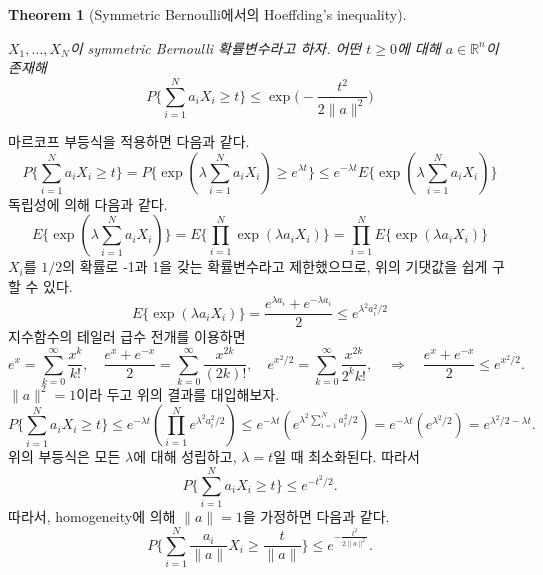\documentclass[
  letterpaper,
  DIV=11,
  numbers=noendperiod]{scrreprt}
\theoremstyle{plain}
\newtheorem{theorem}{Theorem}[chapter]
\theoremstyle{definition}
\theoremstyle{definition}
\theoremstyle{plain}
\theoremstyle{plain}
\theoremstyle{remark}
\begin{document}
\begin{theorem}[Symmetric Bernoulli에서의 Hoeffding's
inequality]\protect\hypertarget{thm-hoeffdingbernoulli}{}\label{thm-hoeffdingbernoulli}

\(X_1, \ldots, X_N\)이 symmetric Bernoulli 확률변수라고 하자. 어떤
\(t\geq 0\)에 대해 \(a \in \mathbb{R}^n\)이 존재해 \[
P\{ \sum_{i=1}^N a_i X_i \geq t \} \leq \exp \Big( - \frac{t^2}{2\|a\|^2} \Big)
\]

\end{theorem}

\begin{tcolorbox}[enhanced jigsaw, opacityback=0, colframe=quarto-callout-tip-color-frame, breakable, left=2mm, arc=.35mm, rightrule=.15mm, titlerule=0mm, coltitle=black, title=\textcolor{quarto-callout-tip-color}{\faLightbulb}\hspace{0.5em}{Proof}, colbacktitle=quarto-callout-tip-color!10!white, toptitle=1mm, bottomtitle=1mm, leftrule=.75mm, toprule=.15mm, colback=white, opacitybacktitle=0.6, bottomrule=.15mm]

마르코프 부등식을 적용하면 다음과 같다. \[
P\{ \sum_{i=1}^N a_i X_i \geq t \} = P \{ \exp (\lambda \sum_{i=1}^N a_i X_i) \geq e^{\lambda t} \} \leq e^{-\lambda t}E\{ \exp (\lambda \sum_{i=1}^N a_i X_i) \}
\] 독립성에 의해 다음과 같다. \[
E\{ \exp (\lambda \sum_{i=1}^N a_i X_i) \} = E \{ \prod_{i=1}^N \exp (\lambda a_i X_i)  \} = \prod_{i=1}^N E\{ \exp (\lambda a_i X_i)\}
\] \(X_i\)를 \(1/2\)의 확률로 -1과 1을 갖는 확률변수라고 제한했으므로,
위의 기댓값을 쉽게 구할 수 있다. \[
E\{ \exp (\lambda a_i X_i)\} = \frac{e^{\lambda a_i }+ e^{-\lambda a_i}}{2}\leq e^{\lambda^2 a_i^2 / 2}
\] 지수함수의 테일러 급수 전개를 이용하면 \[
e^{x}=\sum_{k=0}^{\infty}\frac{x^k}{k!},\quad{} \frac{e^{x}+e^{-x}}{2} =\sum_{k=0}^{\infty}\frac{x^{2k}}{(2k)!}, \quad{} e^{x^2/2}=\sum_{k=0}^{\infty}\frac{x^{2k}}{2^k k!},\quad{} \Longrightarrow\quad{} \frac{e^{x}+e^{-x}}{2} \leq e^{x^2/2}.
\] \(\|a\|^2=1\)이라 두고 위의 결과를 대입해보자. \[
P\{ \sum_{i=1}^N a_i X_i \geq t \} \leq e^{-\lambda t}(\prod_{i=1}^N e^{\lambda^2 a_i^2/2})\leq e^{-\lambda t}(e^{\lambda^2 \sum_{i=1}^N a_i^2/2}) = e^{-\lambda t}(e^{\lambda^2/2}) = e^{\lambda^2/2 - \lambda t}.
\] 위의 부등식은 모든 \(\lambda\)에 대해 성립하고, \(\lambda=t\)일 때
최소화된다. 따라서 \[
P\{ \sum_{i=1}^N a_i X_i \geq t \} \leq e^{-t^2/2}.
\] 따라서, homogeneity에 의해 \(\|a\|=1\)을 가정하면 다음과 같다. \[
P \{ \sum_{i=1}^N \frac{a_i}{\| a\|}X_i \geq \frac{t}{\|a\|} \} \leq e^{-\frac{t^2}{2\|a\|^2}}.
\]

\end{tcolorbox}
\end{document}
